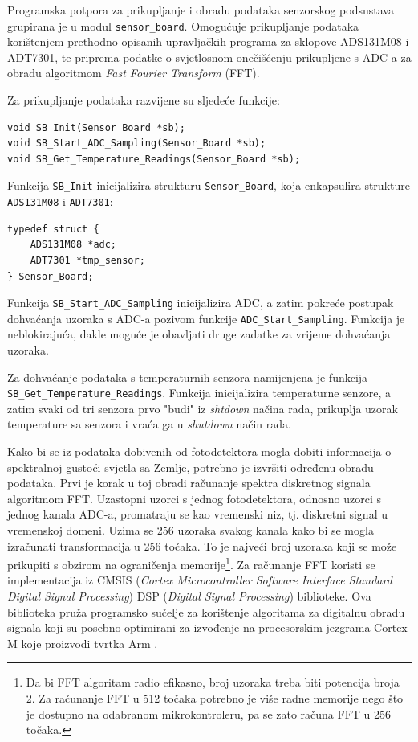 Programska potpora za prikupljanje i obradu podataka senzorskog podsustava grupirana je u modul \texttt{sensor\_board}. Omogućuje prikupljanje podataka korištenjem prethodno opisanih upravljačkih programa za sklopove ADS131M08 i ADT7301, te priprema podatke o svjetlosnom onečišćenju prikupljene s ADC-a za obradu algoritmom \textit{Fast Fourier Transform} (FFT).

Za prikupljanje podataka razvijene su sljedeće funkcije:
\begin{lstlisting}
void SB_Init(Sensor_Board *sb);
void SB_Start_ADC_Sampling(Sensor_Board *sb);
void SB_Get_Temperature_Readings(Sensor_Board *sb);
\end{lstlisting}

Funkcija \texttt{SB\_Init} inicijalizira strukturu \texttt{Sensor\_Board}, koja enkapsulira strukture \texttt{ADS131M08} i \texttt{ADT7301}:
\begin{lstlisting}
typedef struct {
    ADS131M08 *adc;
    ADT7301 *tmp_sensor;
} Sensor_Board;
\end{lstlisting}

Funkcija \texttt{SB\_Start\_ADC\_Sampling} inicijalizira ADC, a zatim pokreće postupak dohvaćanja uzoraka s ADC-a pozivom funkcije \texttt{ADC\_Start\_Sampling}. Funkcija je neblokirajuća, dakle moguće je obavljati druge zadatke za vrijeme dohvaćanja uzoraka.

Za dohvaćanje podataka s temperaturnih senzora namijenjena je funkcija \\\texttt{SB\_Get\_Temperature\_Readings}. Funkcija inicijalizira temperaturne senzore, a zatim svaki od tri senzora prvo "budi" iz \textit{shtdown} načina rada, prikuplja uzorak temperature sa senzora i vraća ga u \textit{shutdown} način rada.

Kako bi se iz podataka dobivenih od fotodetektora mogla dobiti informacija o spektralnoj gustoći svjetla sa Zemlje, potrebno je izvršiti određenu obradu podataka. Prvi je korak u toj obradi računanje spektra diskretnog signala algoritmom FFT. Uzastopni uzorci s jednog fotodetektora, odnosno uzorci s jednog kanala ADC-a, promatraju se kao vremenski niz, tj. diskretni signal u vremenskoj domeni. Uzima se 256 uzoraka svakog kanala kako bi se mogla izračunati transformacija u 256 točaka. To je najveći broj uzoraka koji se može prikupiti s obzirom na ograničenja memorije\footnote{Da bi FFT algoritam radio efikasno, broj uzoraka treba biti potencija broja 2. Za računanje FFT u 512 točaka potrebno je više radne memorije nego što je dostupno na odabranom mikrokontroleru, pa se zato računa FFT u 256 točaka.}. Za računanje FFT koristi se implementacija iz CMSIS (\textit{Cortex Microcontroller Software Interface Standard Digital Signal Processing}) DSP (\textit{Digital Signal Processing}) biblioteke. Ova biblioteka pruža programsko sučelje za korištenje algoritama za digitalnu obradu signala koji su posebno optimirani za izvođenje na procesorskim jezgrama Cortex-M koje proizvodi tvrtka Arm \cite{cmsis_dsp_documentation}.

